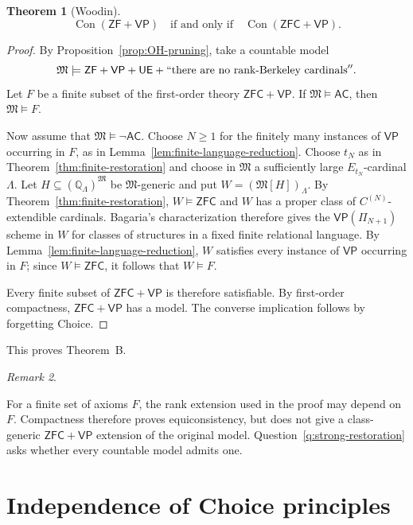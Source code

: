 \documentclass[11pt,a4paper]{amsart}
\newif\ifrevisionblue
\DeclareRobustCommand{\revision}[1]{{\ifrevisionblue\color{blue}\fi#1}}
\newcommand{\VP}{\mathsf{VP}}
\newcommand{\AC}{\mathsf{AC}}
\newcommand{\ZF}{\mathsf{ZF}}
\newcommand{\ZFC}{\mathsf{ZFC}}
\newcommand{\Con}{\operatorname{Con}}
\newcommand{\UE}{\mathsf{UE}}
\theoremstyle{plain}
\newtheorem{theorem}{Theorem}[section]
\theoremstyle{definition}
\theoremstyle{remark}
\newtheorem{remark}[theorem]{Remark}
\begin{document}
\begin{theorem}[\revision{Woodin}]\label{thm:consistency-transfer}
\[
\Con(\ZF+\VP)\quad\text{if and only if}\quad\Con(\ZFC+\VP).
\]
\end{theorem}

\begin{proof}
By Proposition~\ref{prop:OH-pruning}, take a countable model
\[
\mathfrak M\models\ZF+\VP+\UE+``\text{there are no rank-Berkeley cardinals}''.
\]
Let $F$ be a finite subset of the first-order theory $\ZFC+\VP$.  If $\mathfrak M\models\AC$, then $\mathfrak M\models F$.

Now assume that $\mathfrak M\models\neg\AC$.  Choose $N\geq1$ for the finitely many instances of $\VP$ occurring in $F$, as in Lemma~\ref{lem:finite-language-reduction}.  Choose $t_N$ as in Theorem~\ref{thm:finite-restoration} and choose in $\mathfrak M$ a sufficiently large $E_{t_N}$-cardinal $\Lambda$.  Let $H\subseteq(\mathbb Q_\Lambda)^{\mathfrak M}$ be $\mathfrak M$-generic and put $W=(\mathfrak M[H])_\Lambda$.  By Theorem~\ref{thm:finite-restoration}, $W\models\ZFC$ and $W$ has a proper class of $C^{(N)}$-extendible cardinals.  {Bagaria's characterization \cite[Theorem~4.3(2), Corollary~4.7, Theorem~4.11, and the paragraph following Theorem~4.12]{BagariaCn} therefore gives the $\VP(\Pi_{N+1})$ scheme in $W$ for classes of structures in a fixed finite relational language.  By Lemma~\ref{lem:finite-language-reduction}, $W$ satisfies every instance of $\VP$ occurring in $F$; since $W\models\ZFC$, it follows that $W\models F$.}

Every finite subset of $\ZFC+\VP$ is therefore satisfiable.  By first-order compactness, $\ZFC+\VP$ has a model.  The converse implication follows by forgetting Choice.
\end{proof}

This proves Theorem~B.

\begin{remark}\label{rem:consistency-not-uniform}

For a finite set of axioms $F$, the rank extension used in the proof may depend on $F$.  Compactness therefore proves equiconsistency, but does not give a class-generic $\ZFC+\VP$ extension of the original model.  Question~\ref{q:strong-restoration} asks whether every countable model admits one.
\end{remark}
\endgroup

\section{{Independence of Choice principles}}
\end{document}

